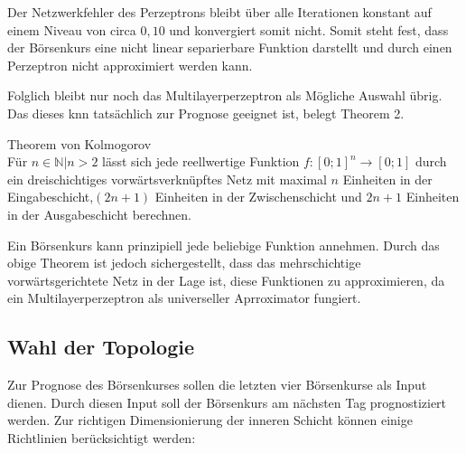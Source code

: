 Der Netzwerkfehler des Perzeptrons bleibt über alle Iterationen konstant auf einem Niveau von circa $0,10$ und konvergiert somit nicht. Somit steht fest, dass der Börsenkurs eine nicht linear separierbare Funktion darstellt und durch einen Perzeptron nicht approximiert werden kann.

Folglich bleibt nur noch das Multilayerperzeptron als Mögliche Auswahl übrig. Das dieses \acs{knn} tatsächlich zur Prognose geeignet ist, belegt Theorem 2.

\begin{theo}Theorem von Kolmogorov\\
Für ${n \in \mathbb{N} | n>2}$ lässt sich jede reellwertige Funktion $f:[0;1]^n\rightarrow[0;1]$ durch ein dreischichtiges vorwärtsverknüpftes Netz mit maximal $n$ Einheiten in der Eingabeschicht,$(2n+1)$ Einheiten in der Zwischenschicht und $2n+1$ Einheiten in der Ausgabeschicht berechnen.
\end{theo}

Ein Börsenkurs kann prinzipiell jede beliebige Funktion annehmen. Durch das obige Theorem ist jedoch sichergestellt, dass das mehrschichtige vorwärtsgerichtete Netz in der Lage ist, diese Funktionen zu approximieren, da ein Multilayerperzeptron als universeller Aprroximator fungiert.

\subsection{Wahl der Topologie}
\label{subsection:Wahl der Topologie}

Zur Prognose des Börsenkurses sollen die letzten vier Börsenkurse als Input dienen. Durch diesen Input soll der Börsenkurs am nächsten Tag prognostiziert werden. Zur richtigen Dimensionierung der inneren Schicht können einige Richtlinien berücksichtigt werden:

